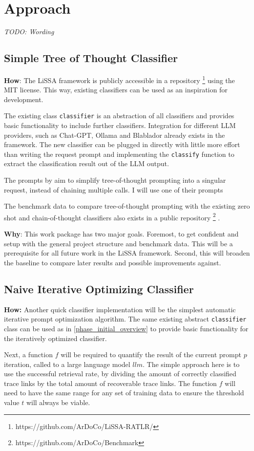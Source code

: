 \chapter{Approach}
\textit{TODO: Wording}
\section{Simple Tree of Thought Classifier}
\textbf{How}: The LiSSA framework is publicly accessible in a repository \footnote{https://github.com/ArDoCo/LiSSA-RATLR/} using the MIT license. This way, existing classifiers can be used as an inspiration for development. 

The existing class \verb|classifier| is an abstraction of all classifiers and provides basic functionality to include further classifiers. Integration for different LLM providers, such as Chat-GPT, Ollama and Blablador already exists in the framework. The new classifier can be plugged in directly with little more effort than writing the request prompt and implementing the \verb|classify| function to extract the classification result out of the LLM output.

The prompts by  aim to simplify tree-of-thought prompting into a singular request, instead of chaining multiple calls. I will use one of their prompts

The benchmark data to compare tree-of-thought prompting with the existing zero shot and chain-of-thought classifiers also exists in a public repository \footnote{https://github.com/ArDoCo/Benchmark} \cite{fuchss2022ArDoCoBenchmark}. 


\textbf{Why}: This work package has two major goals. Foremost, to get confident and setup with the general project structure and benchmark data. This will be a prerequisite for all future work in the LiSSA framework. Second, this will broaden the baseline to compare later results and possible improvements against.

\section{Naive Iterative Optimizing Classifier}
\textbf{How:} Another quick classifier implementation will be the simplest automatic iterative prompt optimization algorithm. The same existing abstract \verb|classifier| class can be used as in \ref{phase_initial_overview} to provide basic functionality for the iteratively optimized classifier.

Next, a function $f$ will be required to quantify the result of the current prompt $p$ iteration, called to a large language model $llm$. The simple approach here is to use the successful retrieval rate, by dividing the amount of correctly classified trace links by the total amount of recoverable trace links.
The function $f$ will need to have the same range for any set of training data to ensure the threshold value $t$ will always be viable.


